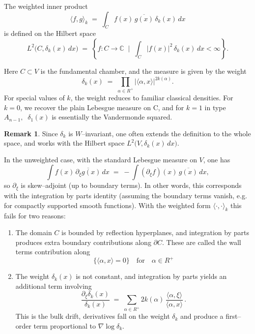 \documentclass[12pt]{article}
\newcommand{\1}{\mathbbm{1}}
\theoremstyle{definition}
\newtheorem{remark}{Remark}
\begin{document}
 The weighted inner product
\begin{equation}\label{prodchamber}
  \langle f,g \rangle_k \;=\; \int_C f(x)\,\overline{g(x)}\,\delta_k(x)\,dx
\end{equation}
is defined on the Hilbert space
\[
  L^2\!\big(C,\delta_k(x)\,dx\big)
  \;=\;\left\{ f : C \to \mathbb{C} \;\;\Big|\;\;
  \int_C |f(x)|^2\,\delta_k(x)\,dx < \infty \right\}.
\]

Here $C \subset V$ is the fundamental chamber, and the measure is given by the weight
\[
  \delta_k(x) \;=\; \prod_{\alpha \in R^+} |\langle \alpha , x \rangle|^{2k(\alpha)} .
\]
For special values of \(k\), the weight reduces to familiar classical densities. For $k=0$,  we recover the plain Lebesgue measure on C, and for $k=1$ in type $A_{n-1}, \;\; \delta_{1}(x)$ is essentially the Vandermonde squared.

\begin{remark}
Since $\delta_k$ is $W$--invariant, one often extends the definition to the whole space,
and works with the Hilbert space $L^2\!\big(V,\delta_k(x)\,dx\big)$.

\end{remark}



In the unweighted case, with the standard Lebesgue measure on $V$, one has
\[
  \int f(x)\,\overline{\partial_{\xi} g(x)}\,dx
  \;=\; - \int (\partial_{\xi} f)(x)\,\overline{g(x)}\,dx ,
\]
so $\partial_{\xi}$ is skew--adjoint (up to boundary terms). In other words, this corresponds with the integration by parts identity (assuming the boundary terms vanish, e.g. for compactly supported smooth functions). With the weighted form $\langle \cdot,\cdot\rangle_k$ this fails for two reasons:
\begin{enumerate}
  \item The domain $C$ is bounded by reflection hyperplanes, and integration by parts
  produces extra boundary contributions along $\partial C$. These are called  the {wall terms} contribution along 
  \begin{equation}\label{effect1}
  \{ \langle \alpha, x \rangle = 0 \} \quad \text{for} \quad \alpha \in R^{+} 
  \end{equation}
  \item The weight $\delta_k(x)$ is not constant, and integration by parts yields an
  additional term involving
\begin{equation}\label{effect2}
    \frac{\partial_{\xi} \delta_k(x)}{\delta_k(x)}
    \;=\; \sum_{\alpha \in R^{+}} 2k(\alpha)\,
    \frac{\langle \alpha, \xi \rangle}{\langle \alpha, x \rangle}\,.
\end{equation}
 This is the {bulk drift}, derivatives fall on the weight $\delta_{k}$ and produce
a first--order term proportional to $\nabla \log \delta_{k}$.

\end{enumerate}
\end{document}
